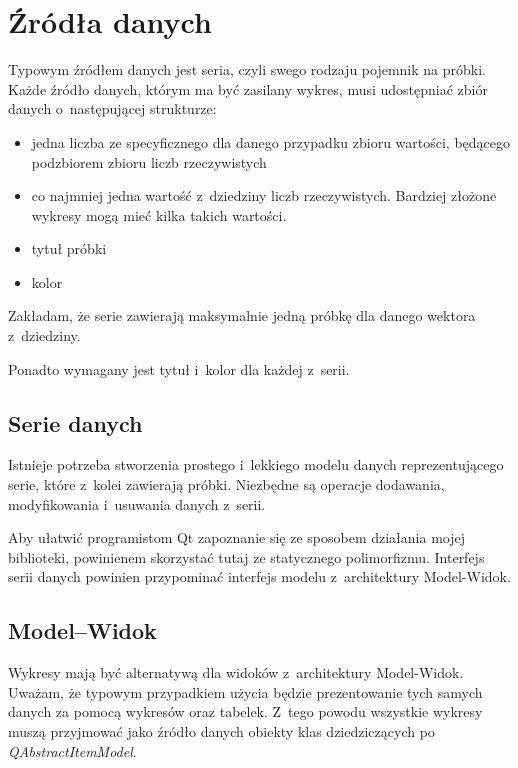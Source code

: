\section{Źródła danych}
Typowym źródłem danych jest seria, czyli swego rodzaju pojemnik na próbki. Każde źródło danych, którym ma być zasilany wykres, musi udostępniać zbiór danych o~następującej strukturze:

\begin{itemize}
\item{jedna liczba ze specyficznego dla danego przypadku zbioru wartości, będącego podzbiorem zbioru liczb rzeczywistych}
\item{co najmniej jedna wartość z~dziedziny liczb rzeczywistych. Bardziej złożone wykresy mogą mieć kilka takich wartości.}
\item{tytuł próbki}
\item{kolor}
\end{itemize}

Zakładam, że serie zawierają maksymalnie jedną próbkę dla danego wektora z~dziedziny. 

Ponadto wymagany jest tytuł i~kolor dla każdej z~serii.


\subsection{Serie danych}
Istnieje potrzeba stworzenia prostego i~lekkiego modelu danych reprezentującego serie, które z~kolei zawierają próbki. Niezbędne są operacje dodawania, modyfikowania i~usuwania danych z~serii. 

Aby ułatwić programistom Qt zapoznanie się ze sposobem działania mojej biblioteki, powinienem skorzystać tutaj ze statycznego polimorfizmu. Interfejs serii danych powinien przypominać interfejs modelu z~architektury Model-Widok.

\subsection{Model--Widok}
Wykresy mają być alternatywą dla widoków z~architektury Model-Widok. Uważam, że typowym przypadkiem użycia będzie prezentowanie tych samych danych za pomocą wykresów oraz tabelek. Z~tego powodu wszystkie wykresy muszą przyjmować jako źródło danych obiekty klas dziedziczących po \textit{QAbstractItemModel}.


